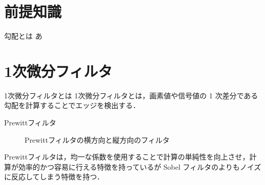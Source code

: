\documentclass[10pt, jfont=ipaexm]{beamer} %
\begin{document}
\section{前提知識}

\begin{frame}{勾配とは}
    あ
\end{frame}

\section{1次微分フィルタ}
\begin{frame}{1次微分フィルタとは}
    1次微分フィルタとは，画素値や信号値の 1 次差分である勾配を計算することでエッジを検出する．
\end{frame}

\begin{frame}{Prewittフィルタ}
    \begin{block}{}
        \begin{figure}[H]
            \qquad
            \caption{Prewittフィルタの横方向と縦方向のフィルタ}
            \label{fig:prewitt_filter}
        \end{figure}
    \end{block}
    Prewittフィルタは，均一な係数を使用することで計算の単純性を向上させ，計算が効率的かつ容易に行える特徴を持っているが Sobel フィルタのよりもノイズに反応してしまう特徴を持つ．
\end{frame}
\end{document}
